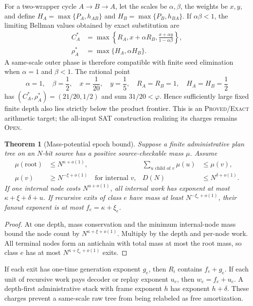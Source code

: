 \documentclass[11pt]{article}
\newtheorem{theorem}{Theorem}[section]
\newcommand{\Exact}{\textsc{Proved/Exact}}
\newcommand{\Open}{\textsc{Open}}
\begin{document}
For a two-wrapper cycle $A\to B\to A$, let the scales be $\alpha,\beta$, the
weights be $x,y$, and define
$H_A=\max\{P_A,h_{AB}\}$ and $H_B=\max\{P_B,h_{BA}\}$.
If $\alpha\beta<1$, the limiting Bellman values obtained by exact
substitution are
\begin{align}
 C_A^*&=\max\left\{R_A,x+\alpha R_B,
             \frac{x+\alpha y}{1-\alpha\beta}\right\},\label{eq:double-time}\\
 \rho_A^*&=\max\{H_A,\alpha H_B\}.
 \label{eq:double-space}
\end{align}
A same-scale outer phase is therefore compatible with finite seed
elimination when $\alpha=1$ and $\beta<1$.  The rational point
\[
 \alpha=1,\quad\beta=\frac12,\quad x=\frac1{20},\quad y=\frac15,
 \quad R_A=R_B=1,\quad H_A=H_B=\frac12
\]
has $(C_A^*,\rho_A^*)=(21/20,1/2)$ and sum
$31/20<\varphi$.  Hence sufficiently large fixed finite depth also lies
strictly below the product frontier.  This is an \Exact{} arithmetic target;
the all-input SAT construction realizing its charges remains \Open{}.

\begin{theorem}[Mass-potential epoch bound]
Suppose a finite administrative plan tree on an $N$-bit source has a positive
source-checkable mass $\mu$.  Assume
\begin{align*}
 \mu(\mathrm{root})&\le N^{\kappa+o(1)},&
 \sum_{u\text{ child of }v}\mu(u)&\le\mu(v),\\
 \mu(v)&\ge N^{-\xi+o(1)}\quad\text{for internal }v,&
 D(N)&\le N^{\delta+o(1)}.
\end{align*}
If one internal node costs $N^{u+o(1)}$, all internal work has exponent at
most $\kappa+\xi+\delta+u$.  If recursive exits of class $e$ have mass at
least $N^{-\xi_e+o(1)}$, their fanout exponent is at most
$f_e=\kappa+\xi_e$.
\end{theorem}

\begin{proof}
At one depth, mass conservation and the minimum internal-node mass bound the
node count by $N^{\kappa+\xi+o(1)}$.  Multiply by the depth and per-node work.
All terminal nodes form an antichain with total mass at most the root mass,
so class $e$ has at most $N^{\kappa+\xi_e+o(1)}$ exits.
\end{proof}

If each exit has one-time generation exponent $g_e$, then $R_i$ contains
$f_e+g_e$.  If each unit of recursive work pays decoder or replay exponent
$u_e$, then $w_e=f_e+u_e$.  A depth-first administrative stack with frame
exponent $h$ has exponent $h+\delta$.  These charges prevent a same-scale raw
tree from being relabeled as free amortization.
\end{document}
